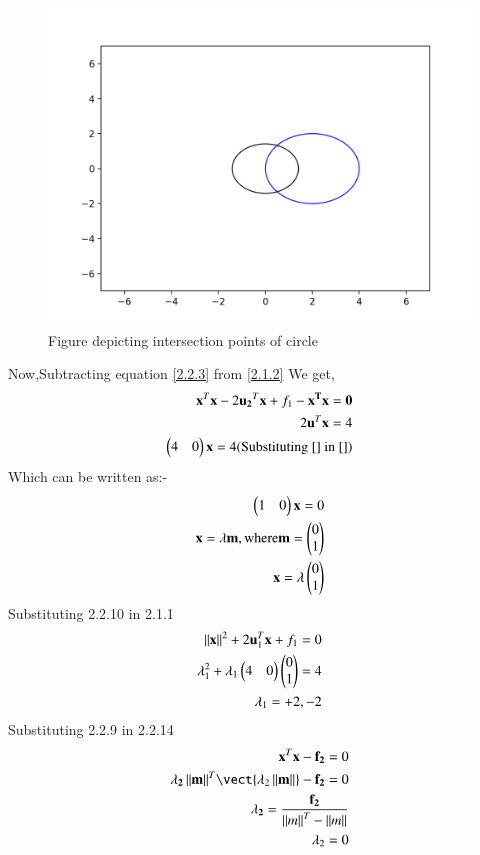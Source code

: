 \documentclass[journal,12pt,twocolumn]{IEEEtran}
\begin{document}
 \begin{figure}[h!]
	\centering
	\includegraphics[width=\columnwidth]{Assignment_5.png}
	\caption{Figure depicting intersection points of circle}
	\label{myfig}
\end{figure}
Now,Subtracting equation \eqref{2.2.3} from \eqref{2.1.2} We get,
 \begin{align}
 {\mathbf{x}^{T}\mathbf{x}-2\mathbf{u_2}^T\mathbf{x}}+f_1-\bf{x}^{T}\bf{x}=0\\
 2\mathbf{u}^{T}\mathbf{x}=4\\
 \begin{pmatrix}4&0\end{pmatrix}\mathbf{x}=4\text{(Substituting \eqref{} in \eqref{})}
 \end{align}
 Which can be written as:-
 \begin{align}
 \begin{pmatrix}1&0\end{pmatrix}\mathbf{x}=0\\
 \mathbf{x} = \lambda \mathbf{m}, \text{where} \mathbf{m} = \begin{pmatrix}0\\1\end{pmatrix}\\
 \mathbf{x} = \lambda \begin{pmatrix}0\\1\end{pmatrix}
 \end{align}
 Substituting 2.2.10 in 2.1.1\\
 \begin{align}
 \left\lVert\mathbf{x}\right\rVert^2 + 2\mathbf{u}_1^T\mathbf{x} + f_1 = 0\\
  \lambda_1^{2}+\lambda_1\begin{pmatrix}4&0\end{pmatrix}\begin{pmatrix}0\\1\end{pmatrix}=4\\
 \lambda_1=+2,-2
 \end{align}
  Substituting 2.2.9 in 2.2.14
  \begin{align}
  \vec{x}^T\vec{x} - \vec{f_2} = 0\\
 \vec{\lambda_2\norm{\vec{m}}}^T\vect{\lambda_2\norm{\vec{m}}} -\vec{ f_2} = 0\\
\vec{\lambda_2}=\frac{\vec{f_2}}{\norm{m}^T-\norm{m}}\\
\lambda_2=0
 \end{align}
\end{document}
